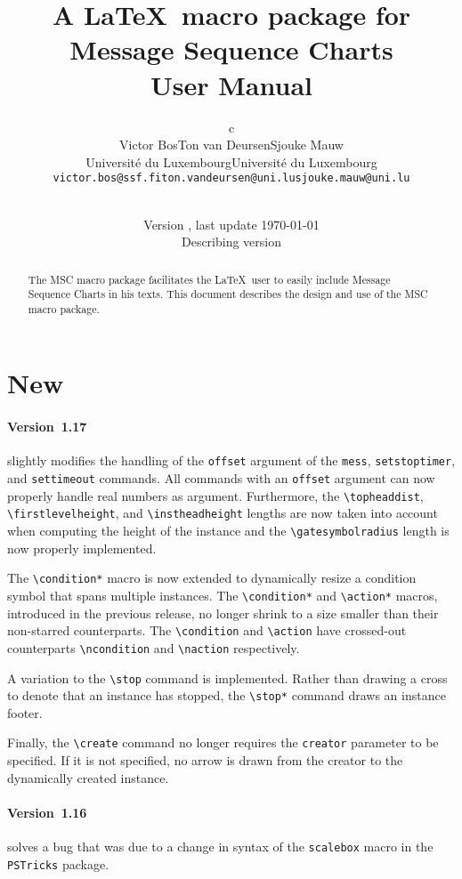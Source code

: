 \documentclass[12pt,a4paper]{article}
\title{
  A \LaTeX\ macro package for Message Sequence Charts\\{\large User Manual}
}
\author{
 \begin{tabular}{c}
  \begin{tabular}{ccc}
   Victor Bos &
   Ton van Deursen &
   Sjouke Mauw \\
   &
   \scriptsize Universit\'e du Luxembourg &
   \scriptsize Universit\'e du Luxembourg \\[-0.8ex]
   \scriptsize \texttt{victor.bos@ssf.fi} &
   \scriptsize \texttt{ton.vandeursen@uni.lu} & 
   \scriptsize \texttt{sjouke.mauw@uni.lu}
  \end{tabular}\\
 \end{tabular}
}
\date{\small Version \mscversion, last update \today\\
      Describing \mscpack{} version \mscversion}
\newcommand{\acro}[1]{{#1}}
\newcommand{\MSC}{\acro{MSC}}
\newcommand{\mscpack}{\MSC{} macro package}
\begin{document}
\maketitle

\begin{abstract}
\noindent
The \mscpack{} facilitates the \LaTeX\ user to easily include
Message Sequence Charts in his texts. This document describes the
design and use of the \mscpack.
\end{abstract}

\tableofcontents
\section{New}
\label{new}

\paragraph{Version~1.17} slightly modifies the handling of the
\verb+offset+ argument of the \verb+mess+, \verb+setstoptimer+, and
\verb+settimeout+ commands. All commands with an \verb+offset+
argument can now properly handle real numbers as
argument. Furthermore, the \verb+\topheaddist+,
\verb+\firstlevelheight+, and \verb+\instheadheight+ lengths are now
taken into account when computing the height of the instance and the
\verb+\gatesymbolradius+ length is now properly implemented.

The \verb+\condition*+ macro is now extended to dynamically
resize a condition symbol that spans multiple instances. The
\verb+\condition*+ and \verb+\action*+ macros, introduced in the
previous release, no longer shrink to a size smaller than their
non-starred counterparts. The \verb+\condition+ and
\verb+\action+ have crossed-out counterparts \verb+\ncondition+ and
\verb+\naction+ respectively.

A variation to the \verb+\stop+ command is implemented. Rather than
drawing a cross to denote that an instance has stopped, the
\verb+\stop*+ command draws an instance footer.

Finally, the \verb+\create+ command no longer requires the
\verb+creator+ parameter to be specified. If it is not specified, no
arrow is drawn from the creator to the dynamically created instance. 



\paragraph{Version~1.16} solves a bug that was due to a change in
syntax of the \verb+scalebox+ macro in the \verb+PSTricks+ package.
\end{document}
